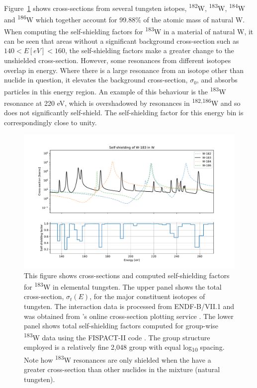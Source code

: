 Figure~\ref{fig:W-183_shielding} shows cross-sections from several tungsten istopes, \textsuperscript{182}W, \textsuperscript{183}W, \textsuperscript{184}W and \textsuperscript{186}W which together account for 99.88\% of the atomic mass of natural W. When computing the self-shielding factors for \textsuperscript{183}W in a material of natural W, it can be seen that areas without a significant background cross-section such as $140 < E [eV] < 160$, the self-shielding factors make a greater change to the unshielded cross-section. However, some resonances from different isotopes overlap in energy. Where there is a large resonance from an isotope other than nuclide in question, it elevates the background cross-section, $\sigma_{0}$, and absorbs particles in this energy region. An example of this behaviour is the \textsuperscript{183}W resonance at 220 eV, which is overshadowed by resonances in \textsuperscript{182,186}W and so does not significantly self-shield. The self-shielding factor for this energy bin is correspondingly close to unity.

\begin{figure}[H]
  \centering
  \includegraphics[width=\linewidth]{W-183_shielding}
  \caption{This figure shows cross-sections and computed self-shielding factors for \textsuperscript{183}W in elemental tungsten. The upper panel shows the total cross-section, $\sigma_{t}(E)$, for the major constituent isotopes of tungsten. The interaction data is processed from ENDF-B/VII.1 and was obtained from \citeauthor{Shimwell2018}'s online cross-section plotting service \cite{Shimwell2018}. The lower panel shows total self-shielding factors computed for group-wise \textsuperscript{183}W data using the FISPACT-II code \cite{sublet2017a}. The group structure employed is a relatively fine 2,048 group with equal log\textsubscript{10} spacing. Note how \textsuperscript{183}W resonances are only shielded when the have a greater cross-section than other nuclides in the mixture (natural tungsten).}
  \label{fig:W-183_shielding}
\end{figure}

